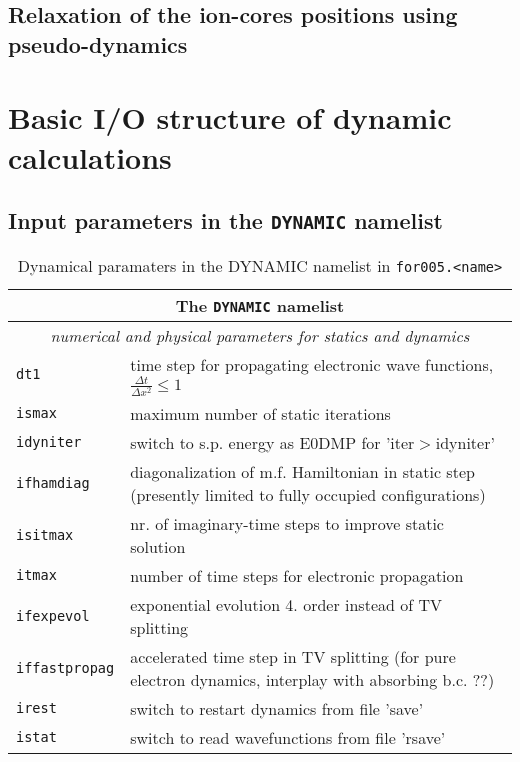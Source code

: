 \documentclass[11pt,a4paper]{article}
\begin{document}
		\subsection{Relaxation of the ion-cores positions using pseudo-dynamics}

	\section{Basic I/O structure of dynamic calculations}
		\subsection{Input parameters in the \texttt{DYNAMIC} namelist}
		
			\begin{table}[h]
				\caption{Dynamical paramaters in the DYNAMIC namelist in \texttt{for005.<name>}}\label{tab:dyn-input-params-general}
				\begin{tabular}{|p{3.5cm}|p{11.2cm}|}
					\hline
					\multicolumn{2}{|c|}{The \texttt{DYNAMIC} namelist}\\
					\hline
					\multicolumn{2}{|c|}{\textit{\color{activeColor}numerical and physical parameters for statics and dynamics}} \\
					\hline
					\texttt{dt1}& time step for propagating electronic wave functions,  $\frac{\Delta t}{\Delta x^{2}}\leq 1$\\
					\hline
					\texttt{ismax}& maximum number of static iterations \\
					\hline
					\texttt{idyniter}& switch to s.p. energy as E0DMP for 'iter$>$idyniter'\\
					\hline
					\texttt{ifhamdiag} & diagonalization of m.f. Hamiltonian in static step (presently limited to fully occupied configurations)\\
					\texttt{isitmax}& nr. of imaginary-time steps to improve static solution\\
					\hline
					\texttt{itmax}& number of time steps for electronic propagation\\
					\hline
					\texttt{ifexpevol} & exponential evolution 4. order instead of TV splitting\\
					\hline
					\texttt{iffastpropag} & accelerated time step in TV splitting (for pure electron dynamics, interplay with absorbing b.c. ??)\\
					\hline
					\texttt{irest}& switch to restart dynamics from file 'save'\\
					\hline
					\texttt{istat}& switch to read wavefunctions from file 'rsave'

\end{tabular}
\end{table}
\end{document}

